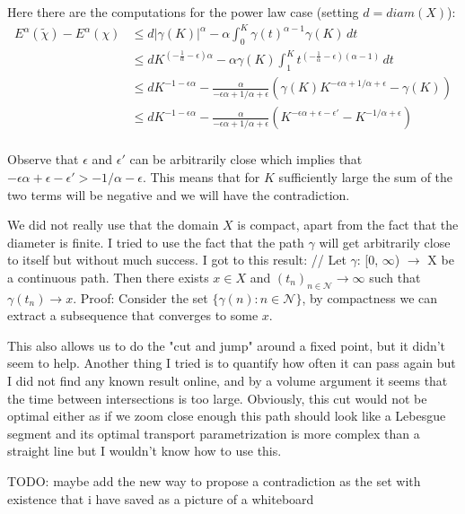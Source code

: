 \documentclass[12pt,a4paper]{article}
\numberwithin{equation}{section}
\theoremstyle{mytheorem}
\theoremstyle{myremark}
\theoremstyle{myparagraph}
\begin{document}
    Here there are the computations for the power law case (setting $d=diam(X)$):
    \begin{align*}
        E^\alpha(\tilde{\chi}) - E^\alpha(\chi) &\le d|\gamma(K)|^\alpha - \alpha \int_0^K \gamma(t)^{\alpha - 1} \gamma(K) \, dt \\
        &\le dK^{(-\frac{1}{\alpha} - \epsilon)\alpha} - \alpha\gamma(K)\int_1^K t^{(-\frac{1}{\alpha} - \epsilon)(\alpha - 1)} \, dt \\
        &\le dK^{-1 - \epsilon\alpha} - \frac{\alpha}{-\epsilon\alpha + 1/\alpha + \epsilon} \left( \gamma(K) K^{-\epsilon\alpha + 1/\alpha + \epsilon} - \gamma(K) \right) \\
        &\le dK^{-1 - \epsilon\alpha} - \frac{\alpha}{-\epsilon\alpha + 1/\alpha + \epsilon} \left( K^{-\epsilon\alpha + \epsilon - \epsilon'} - K^{-1/\alpha + \epsilon} \right) \\
    \end{align*}

    Observe that $\epsilon$ and $\epsilon'$ can be arbitrarily close which implies that $-\epsilon\alpha + \epsilon - \epsilon' > -1/\alpha - \epsilon$.
    This means that for $K$ sufficiently large the sum of the two terms will be negative and we will have the contradiction.

    We did not really use that the domain $X$ is compact, apart from the fact that the diameter is finite. I tried to use the fact
    that the path $\gamma$ will get arbitrarily close to itself but without much success. I got to this result: //
    Let $\gamma$: [0, $\infty$) $\to$ X be a continuous path. Then there exists $x \in X$ and $(t_n)_{n \in  \mathcal{N}} \to \infty$ such that
    $\gamma(t_n) \to x$.
    Proof: Consider the set $\{\gamma(n): n \in \mathcal{N}\}$, by compactness we can extract a subsequence that converges to some $x$.

    This also allows us to do the "cut and jump" around a fixed point, but it didn't seem to help. Another thing I tried is to quantify how often
    it can pass again but I did not find any known result online, and by a volume argument it seems that the time between intersections is too large.
    Obviously, this cut would not be optimal either as if we zoom close enough this path should look like a Lebesgue segment
    and its optimal transport parametrization is more complex than a straight line but I wouldn't know how to use this.

    TODO: maybe add the new way to propose a contradiction as the set with existence that i have saved as a picture of a whiteboard
\end{document}
